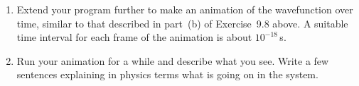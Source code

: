 \documentclass[12pt]{article}
\begin{document}
\begin{exercises}
\begin{enumerate}
\item Extend your program further to make an animation of the wavefunction
  over time, similar to that described in part~(b) of Exercise~9.8 above.
  A suitable time interval for each frame of the animation is about
  $10^{-18}\,$s.

\item Run your animation for a while and describe what you see.  Write a
  few sentences explaining in physics terms what is going on in the system.
\end{enumerate}

\end{exercises}
\end{document}
